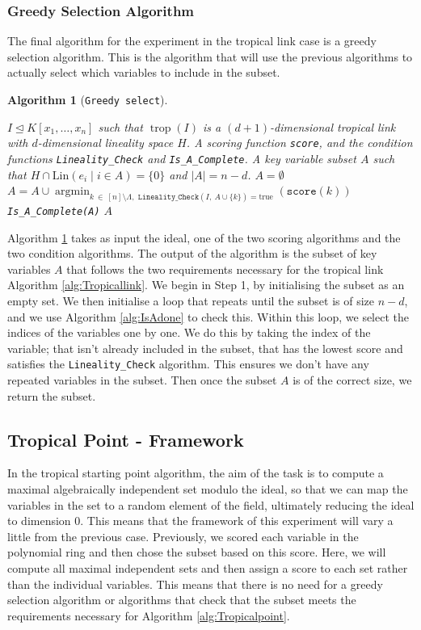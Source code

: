 \documentclass[11pt,reqno,a4paper]{article}
\theoremstyle{theoremstyle}
\theoremstyle{examplestyle}
\theoremstyle{algorithmstyle}
\newtheorem{algorithm}[theorem]{Algorithm}
\numberwithin{equation}{subsection}
\DeclareMathOperator{\trop}{trop}
\DeclareMathOperator*{\argmin}{argmin}
\begin{document}
\subsubsection*{Greedy Selection Algorithm}
The final algorithm for the experiment in the tropical link case is a greedy selection algorithm. This is the algorithm that will use the previous algorithms to actually select which variables to include in the subset.

\begin{algorithm}[\texttt{Greedy select}]\label{alg:Greedy}\
  \begin{algorithmic}[1]
  \REQUIRE $I \trianglelefteq K[x_1,\ldots,x_n]$ such that $\trop(I)$ is a $(d+1)$-dimensional tropical link with $d$-dimensional lineality space $H$. A scoring function \texttt{score}, and the condition functions \texttt{Lineality\_Check} and \texttt{Is\_A\_Complete}.
  \ENSURE A key variable subset $A$ such that $H \cap\text{Lin}(e_i \; | \; i \in A) = \{0\}$ and $|A| = n - d$.
  \STATE $A = \emptyset$
  \REPEAT
  \STATE $A = A \cup \argmin_{k \ \in \  [n]\setminus\Lambda,  \texttt{ Lineality\_Check}\left(I, \ A \cup \{k\}\right) = \text{true}} (\texttt{score}(k))$
  \UNTIL \texttt{Is\_A\_Complete(A)}
  \RETURN $A$
  \end{algorithmic}
\end{algorithm}

Algorithm \ref{alg:Greedy} takes as input the ideal, one of the two scoring algorithms and the two condition algorithms. The output of the algorithm is the subset of key variables $A$ that follows the two requirements necessary for the tropical link Algorithm \ref{alg:Tropicallink}. We begin in Step 1, by initialising the subset as an empty set. We then initialise a loop that repeats until the subset is of size $n-d$, and we use Algorithm \ref{alg:IsAdone} to check this. Within this loop, we select the indices of the variables one by one. We do this by taking the index of the variable; that isn't already included in the subset, that has the lowest score and satisfies the \texttt{Lineality\_Check} algorithm. This ensures we don't have any repeated variables in the subset. Then once the subset $A$ is of the correct size, we return the subset.

\subsection{Tropical Point - Framework}
In the tropical starting point algorithm, the aim of the task is to compute a maximal algebraically independent set modulo the ideal, so that we can map the variables in the set to a random element of the field, ultimately reducing the ideal to dimension 0. This means that the framework of this experiment will vary a little from the previous case. Previously, we scored each variable in the polynomial ring and then chose the subset based on this score. Here, we will compute all maximal independent sets and then assign a score to each set rather than the individual variables. This means that there is no need for a greedy selection algorithm or algorithms that check that the subset meets the requirements necessary for Algorithm \ref{alg:Tropicalpoint}.
\end{document}
